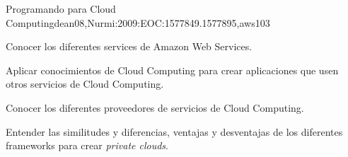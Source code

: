\begin{syllabus}
\begin{unit}{Programando para Cloud Computing}{dean08,Nurmi:2009:EOC:1577849.1577895,aws}{10}{3}
   \begin{unitgoals}
      \item Conocer los diferentes services de Amazon Web Services.
      \item Aplicar conocimientos de Cloud Computing para crear aplicaciones que usen otros servicios de Cloud Computing.
      \item Conocer los diferentes proveedores de servicios de Cloud Computing.
      \item Entender las similitudes y diferencias, ventajas y desventajas de los diferentes frameworks para crear {\it private clouds}.
   \end{unitgoals}
\end{unit}



\begin{coursebibliography}
\end{coursebibliography}

\end{syllabus}
